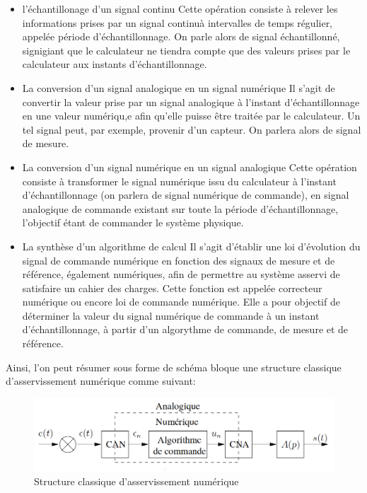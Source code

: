 \documentclass[french,a4paper,12pt]{report}
\begin{document}
	\begin{itemize}
		\item l'échantillonage d'un signal continu
			Cette opération consiste à relever les informations prises par un signal continuà intervalles de temps
			régulier, appelée période d'échantillonnage. On parle alors de signal échantillonné, signigiant que le
			calculateur ne tiendra compte que des valeurs prises par le calculateur aux instants d'échantillonnage.
			
		\item La conversion d'un signal analogique en un signal numérique
			Il s'agit de convertir la valeur prise par un signal analogique à l'instant d'échantillonnage en une
			valeur numériqu,e afin qu'elle puisse être traitée par le calculateur. Un tel signal peut, par exemple, 
			provenir d'un capteur. On parlera alors de signal de mesure.
			 
		\item La conversion d'un signal numérique en un signal analogique
			Cette opération consiste à transformer le signal numérique issu du calculateur à l'instant 
			d'échantillonnage (on parlera de signal numérique de commande), en signal analogique de commande 
			existant sur toute la période d'échantillonnage, l'objectif étant de commander le système physique.
			
		\item  La synthèse d'un algorithme de calcul
			Il s'agit d'établir une loi d'évolution du signal de commande numérique en fonction des signaux de mesure
			et de référence, également numériques, afin de permettre au système asservi de satisfaire un cahier des
			charges. Cette fonction est appelée correcteur numérique ou encore loi de commande numérique. Elle a pour
			objectif de déterminer la valeur du signal numérique de commande à un instant d'échantillonnage, à partir 
			d'un algorythme de commande, de mesure et de référence.
	\end{itemize}
	
	Ainsi, l'on peut résumer sous forme de schéma bloque une structure classique d'asservissement numérique comme suivant:
	
	\begin{figure}[!ht]
    \center
  	\includegraphics[width=17cm]{Assert_1.png}
    \caption{Structure classique d'asservissement numérique}
	\end{figure}	
	
\end{document}
